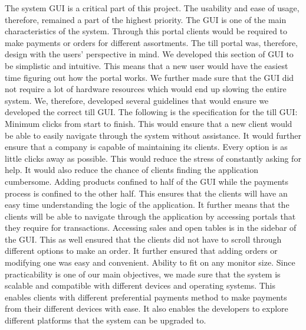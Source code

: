 The system GUI is a critical part of this project. The usability and ease of usage, therefore, remained a part of the highest priority. The GUI is one of the main characteristics of the system. Through this portal clients would be required to make payments or orders for different assortments. The till portal was, therefore, design with the users' perspective in mind. We developed this section of GUI to be simplistic and intuitive. This means that a new user would have the easiest time figuring out how the portal works. We further made sure that the GUI did not require a lot of hardware resources which would end up slowing the entire system. We, therefore, developed several guidelines that would ensure we developed the correct till GUI.
\newline
\newline
The following is the specification for the till GUI: 
\newline
\newline
Minimum clicks from start to finish.  This would ensure that a new client would be able to easily navigate through the system without assistance. It would further ensure that a company is capable of maintaining its clients.  
Every option is as little clicks away as possible. This would reduce the stress of constantly asking for help. It would also reduce the chance of clients finding the application cumbersome. 
\newline
\newline
Adding products confined to half of the GUI while the payments process is confined to the other half. This ensures that the clients will have an easy time understanding the logic of the application. It further means that the clients will be able to navigate through the application by accessing portals that they require for transactions.
\newline
\newline
Accessing sales and open tables is in the sidebar of the GUI. This as well ensured that the clients did not have to scroll through different options to make an order. It further ensured that adding orders or modifying one was easy and convenient. 
\newline
\newline
Ability to fit on any monitor size. Since practicability is one of our main objectives, we made sure that the system is scalable and compatible with different devices and operating systems. This enables clients with different preferential payments method to make payments from their different devices with ease. It also enables the developers to explore different platforms that the system can be upgraded to.
